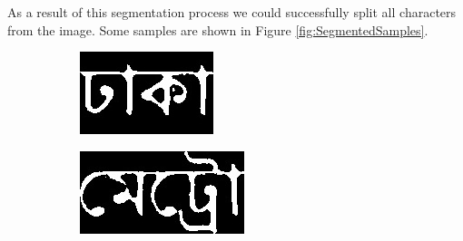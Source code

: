 \documentclass{standalone}
\begin{document}
As a result of this segmentation process we could successfully split all characters from the image. Some samples are shown in Figure \ref{fig:SegmentedSamples}.
\begin{figure}
\centering
\begin{subfigure}{0.40\textwidth}
  \centering
  \includegraphics[width=0.8\linewidth]{./img/sample/stage13-1}
\end{subfigure}
\begin{subfigure}{0.40\textwidth}
  \centering
  \includegraphics[width=0.8\linewidth]{./img/sample/stage13-2}
\end{subfigure}
\begin{subfigure}{0.15\textwidth}
  \centering

\end{subfigure}
\end{figure}
\end{document}
